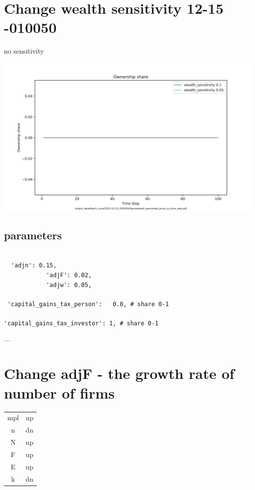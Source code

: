 \documentclass{article}
\begin{document}
\section{Change wealth sensitivity 12-15 -010050}
no sensitivity

\includegraphics[scale=.45]{fig/Analysis/exp0_warranted_price_vs_time_step.png}

\subsection{parameters}
\begin{verbatim}

  'adjn': 0.15,
            'adjF': 0.02,
            'adjw': 0.05, 

 'capital_gains_tax_person':   0.0, # share 0-1

'capital_gains_tax_investor': 1, # share 0-1 
\end{verbatim}
---
\newpage
\section{Change adjF - the growth rate of number of firms }
\begin{tabular}{c|c}
  mpl   &  up\\
  n   &  dn\\
  N   &  up\\
  F   & up \\
  E   &  up\\
  k   & dn
\end{tabular} 
\end{document}
